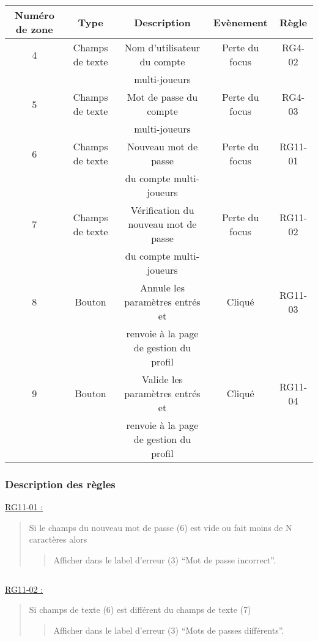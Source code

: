 \documentclass{report}
\begin{document}
			\begin{tabular}{|c|c|c|c|c|} \hline
				Numéro de zone & Type  & Description & Evènement &	Règle \\\hline
				4 & Champs de texte & Nom d'utilisateur du compte &  Perte du focus & RG4-02 \\
				  &                 & multi-joueurs               & & \\\hline
				5 & Champs de texte & Mot de passe du compte & Perte du focus & RG4-03 \\
				  &                 & multi-joueurs          & & \\\hline
				6 & Champs de texte & Nouveau mot de passe &  Perte du focus & RG11-01 \\
				  &                 & du compte multi-joueurs  & & \\\hline
				7 & Champs de texte & Vérification du nouveau mot de passe & Perte du focus & RG11-02 \\
				  &                 & du compte multi-joueurs & & \\\hline
				8 & Bouton & Annule les paramètres entrés et & Cliqué & RG11-03 \\
				  &        & renvoie à la page de gestion du profil & & \\\hline
				9 & Bouton & Valide les paramètres entrés et & Cliqué & RG11-04 \\
				  &        & renvoie à la page de gestion du profil & & \\\hline

			\end{tabular}
			
		\subsubsection{Description des règles}
		
			\underline{RG11-01 :}
				\begin{quote}
					Si le champs du nouveau mot de passe (6) est vide ou fait moins de N caractères alors
					\begin{quote}
						Afficher dans le label d'erreur (3) ``Mot de passe incorrect''.
					\end{quote}
				\end{quote}
			
			$\,$	
			
			\underline{RG11-02 :}
				\begin{quote}
					Si champs de texte (6) est différent du champs de texte (7)
					\begin{quote}
						Afficher dans le label d'erreur (3) ``Mots de passes différents''.
					\end{quote}
				\end{quote}
			$\,$
			
\end{document}
